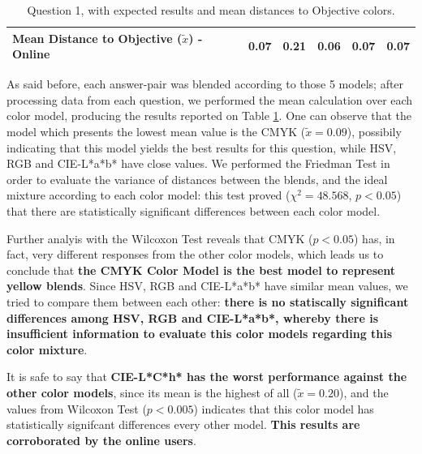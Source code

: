 \begin{table}[H]
{\begin{tabular}{@{}ccccccccc@{}}
    \multicolumn{4}{l}{Mean Distance to Objective ($\tilde{x}$) - Online}                                                                                  & 0.07                                                  & 0.21                                                  & \textbf{0.06}                                         & 0.07                                                  & 0.07                                                  \\ \bottomrule
    \end{tabular}}
  \caption[Question 1, with expected Results.]{Question 1, with expected results and mean distances to Objective colors.}
  \label{table:lab_q1_expected}
\end{table}
%
As said before, each answer-pair was blended according to those 5 models; after processing data from each question, we performed the mean calculation over each color model, producing the results reported on Table \ref{table:lab_q1_expected}.
One can observe that the model which presents the lowest mean value is the CMYK ($\tilde{x} = 0.09$), possibily indicating that this model yields the best results for this question, while HSV, RGB and CIE-L*a*b* have close values. We performed
the Friedman Test in order to evaluate the variance of distances between the blends, and the ideal mixture according to each color model: this test proved ($\chi^2 = 48.568$, $p < 0.05$) that there are statistically significant differences
between each color model. \par
%
Further analyis with the Wilcoxon Test reveals that CMYK ($p < 0.05$) has, in fact, very different responses from the other color models, which leads us to conclude that \textbf{the CMYK Color Model is the best model to represent yellow blends}.
Since HSV, RGB and CIE-L*a*b* have similar mean values, we tried to compare them between each other: \textbf{there is no statiscally significant differences among HSV, RGB and CIE-L*a*b*, whereby there is insufficient information to evaluate this
color models regarding this color mixture}. \par
%
It is safe to say that \textbf{CIE-L*C*h* has the worst performance against the other color models}, since its mean is the highest of all ($\tilde{x} = 0.20$), and the values from Wilcoxon Test ($p < 0.005$) indicates that this color model has
statistically signifcant differences every other model. \textbf{This results are corroborated by the online users}.
%
